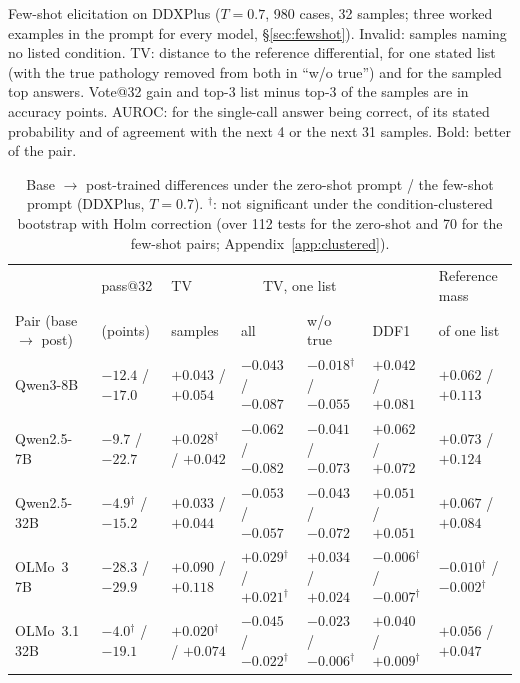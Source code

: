 \documentclass[wcp]{jmlr}
\begin{document}
\begin{table}[t]
\begin{adjustbox}{max width=\textwidth}
\end{adjustbox}
\caption{Few-shot elicitation on DDXPlus ($T{=}0.7$, 980 cases, 32 samples; three worked examples in the prompt for every model, \S\ref{sec:fewshot}). Invalid: samples naming no listed condition. TV: distance to the reference differential, for one stated list (with the true pathology removed from both in ``w/o true'') and for the sampled top answers. Vote@32 gain and top-3 list minus top-3 of the samples are in accuracy points. AUROC: for the single-call answer being correct, of its stated probability and of agreement with the next 4 or the next 31 samples. Bold: better of the pair.}
\label{tab:fewshot}
\end{table}

\begin{table}[t]
\centering
\begin{adjustbox}{max width=\textwidth}
\begin{tabular}{lllllll}
\toprule
 & pass@32 & TV & \multicolumn{2}{c}{TV, one list} & & Reference mass \\
Pair (base $\rightarrow$ post) & (points) & samples & all & w/o true & DDF1 & of one list \\
\midrule
Qwen3-8B & $-12.4$ / $-17.0$ & $+0.043$ / $+0.054$ & $-0.043$ / $-0.087$ & $-0.018$$^{\dagger}$ / $-0.055$ & $+0.042$ / $+0.081$ & $+0.062$ / $+0.113$ \\
Qwen2.5-7B & $-9.7$ / $-22.7$ & $+0.028$$^{\dagger}$ / $+0.042$ & $-0.062$ / $-0.082$ & $-0.041$ / $-0.073$ & $+0.062$ / $+0.072$ & $+0.073$ / $+0.124$ \\
Qwen2.5-32B & $-4.9$$^{\dagger}$ / $-15.2$ & $+0.033$ / $+0.044$ & $-0.053$ / $-0.057$ & $-0.043$ / $-0.072$ & $+0.051$ / $+0.051$ & $+0.067$ / $+0.084$ \\
OLMo~3 7B & $-28.3$ / $-29.9$ & $+0.090$ / $+0.118$ & $+0.029$$^{\dagger}$ / $+0.021$$^{\dagger}$ & $+0.034$ / $+0.024$ & $-0.006$$^{\dagger}$ / $-0.007$$^{\dagger}$ & $-0.010$$^{\dagger}$ / $-0.002$$^{\dagger}$ \\
OLMo~3.1 32B & $-4.0$$^{\dagger}$ / $-19.1$ & $+0.020$$^{\dagger}$ / $+0.074$ & $-0.045$ / $-0.022$$^{\dagger}$ & $-0.023$ / $-0.006$$^{\dagger}$ & $+0.040$ / $+0.009$$^{\dagger}$ & $+0.056$ / $+0.047$ \\
\bottomrule
\end{tabular}
\end{adjustbox}
\caption{Base $\rightarrow$ post-trained differences under the zero-shot prompt / the few-shot prompt (DDXPlus, $T{=}0.7$). $^{\dagger}$: not significant under the condition-clustered bootstrap with Holm correction (over 112 tests for the zero-shot and 70 for the few-shot pairs; Appendix~\ref{app:clustered}).}
\label{tab:fewshotdiff}
\end{table}
\end{document}
